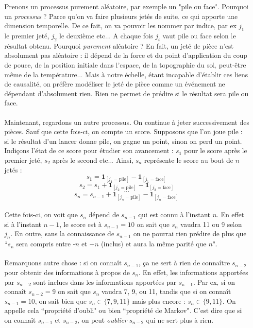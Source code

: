 \documentclass{article}
\begin{document}
Prenons un processus purement aléatoire, par exemple un "pile ou face". Pourquoi un \textit{processus} ? Parce qu'on va faire plusieurs jetés de suite, ce qui apporte une dimension temporelle. De ce fait, on va pouvoir les nommer par indice, par ex $j_1$ le premier jeté, $j_2$ le deuxième etc... A chaque fois $j_i$ vaut pile ou face selon le résultat obtenu. Pourquoi \textit{purement} aléatoire ? En fait, un jeté de pièce n'est absolument pas aléatoire : il dépend de la force et du point d'application du coup de pouce, de la position initiale dans l'espace, de la topographie du sol, peut-\^etre m\^eme de la température... Mais à notre échelle, étant incapable d'établir ces liens de causalité, on préfère modéliser le jeté de pièce comme un événement ne dépendant d'absolument rien. Rien ne permet de prédire si le résultat sera pile ou face. \\
\\
Maintenant, regardons un autre processus. On continue à jeter successivement des pièces. Sauf que cette fois-ci, on compte un score. Supposons que l'on joue pile : si le résultat d'un lancer donne pile, on gagne un point, sinon on perd un point. Indiçons l'état de ce score pour étudier son avancement : $s_1$ pour le score après le premier jeté, $s_2$ après le second etc... Ainsi, $s_n$ représente le score au bout de $n$ jetés :
\[s_1 = \textbf{1}_{[j_1 = \text{pile}]} - \textbf{1}_{[j_1 = \text{face}]}\]
\[s_2 = s_{1} + \textbf{1}_{[j_2 = \text{pile}]} - \textbf{1}_{[j_2 = \text{face}]}\]
\[...\]
\[s_n = s_{n-1} + \textbf{1}_{[j_n = \text{pile}]} - \textbf{1}_{[j_n = \text{face}]}\]
\\
Cette fois-ci, on voit que $s_n$ dépend de $s_{n-1}$ qui est connu à l'instant $n$. En effet si à l'instant $n-1$, le score est à $s_{n-1}=10$ on sait que $s_n$ vaudra 11 ou 9 selon $j_n$. En outre, sans  la connaissance de $s_{n-1}$ on ne pourrai rien prédire de plus que ``$s_n$ sera compris entre -$n$ et +$n$ (inclus) et aura la même parité que $n$". \\
\\
Remarquons autre chose : si on conna\^it $s_{n-1}$, ça ne sert à rien de conna\^itre $s_{n-2}$ pour obtenir des informations à propos de $s_n$. En effet, les informations apportées par $s_{n-2}$ sont inclues dans les informations apportées par $s_{n-1}$. Par ex, si on conna\^it $s_{n-2}=9$ on sait que $s_n$ vaudra 7, 9, ou 11, tandis que si on conna\^it $s_{n-1}=10$, on sait bien que $s_n\in \{7,9,11\}$ mais plus encore : $s_n\in \{9,11\}$. On appelle cela ``propriété d'oubli" ou bien ``propriété de Markov".   C'est dire que si on conna\^ it $s_{n-1}$ et $s_{n-2}$, on peut \textit{oublier} $s_{n-2}$ qui ne sert plus à rien. \\
\end{document}

